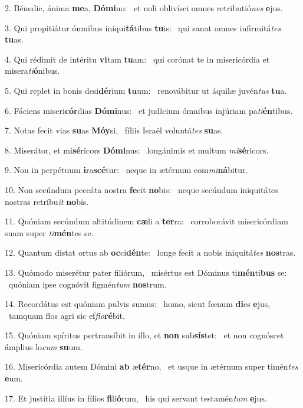 2. Bénedic, ánima \textbf{me}a, \textbf{Dó}\textbf{mi}no: \ast\  et noli oblivísci omnes retributió\textit{nes} \textbf{e}jus.\

3. Qui propitiátur ómnibus iniqui\textbf{tá}tibus \textbf{tu}is: \ast\  qui sanat omnes infirmitá\textit{tes} \textbf{tu}as.\

4. Qui rédimit de intéritu \textbf{vi}tam \textbf{tu}am: \ast\  qui corónat te in misericórdia et misera\textit{ti}\textbf{ó}nibus.\

5. Qui replet in bonis desi\textbf{dé}rium \textbf{tu}um: \ast\  renovábitur ut áquilæ juvén\textit{tus} \textbf{tu}a.\

6. Fáciens miseri\textbf{cór}dias \textbf{Dó}\textbf{mi}nus: \ast\  et judícium ómnibus injúriam pa\textit{ti}\textbf{én}tibus.\

7. Notas fecit vias \textbf{su}as \textbf{Mó}\textbf{y}si, \ast\  fíliis Israël voluntá\textit{tes} \textbf{su}as.\

8. Miserátor, et mi\textbf{sé}ricors \textbf{Dó}\textbf{mi}nus: \ast\  longánimis et multum \textit{mi}\textbf{sé}ricors.\

9. Non in perpétuum \textbf{i}ra\textbf{scé}tur: \ast\  neque in ætérnum com\textit{mi}\textbf{ná}bitur.\

10. Non secúndum peccáta nostra \textbf{fe}cit \textbf{no}bis: \ast\  neque secúndum iniquitátes nostras retríbu\textit{it} \textbf{no}bis.\

11. Quóniam secúndum altitúdinem \textbf{cæ}li a \textbf{ter}ra: \ast\  corroborávit misericórdiam suam super \textit{ti}\textbf{mén}tes se.\

12. Quantum distat ortus ab \textbf{oc}ci\textbf{dén}te: \ast\  longe fecit a nobis iniquitá\textit{tes} \textbf{nos}tras.\

13. Quómodo miserétur pater filiórum, \dag\  misértus est Dóminus ti\textbf{mén}ti\textbf{bus} se: \ast\  quóniam ipse cognóvit figmén\textit{tum} \textbf{nos}trum.\

14. Recordátus est quóniam pulvis sumus: \dag\  homo, sicut fœnum \textbf{di}es \textbf{e}jus, \ast\  tamquam flos agri sic ef\textit{flo}\textbf{ré}bit.\

15. Quóniam spíritus pertransíbit in illo, et \textbf{non} sub\textbf{sís}tet: \ast\  et non cognóscet ámplius lo\textit{cum} \textbf{su}um.\

16. Misericórdia autem Dómini \textbf{ab} æ\textbf{tér}no, \ast\  et usque in ætérnum super timén\textit{tes} \textbf{e}um.\

17. Et justítia illíus in fílios \textbf{fi}li\textbf{ó}rum, \ast\  his qui servant testamén\textit{tum} \textbf{e}jus.\

